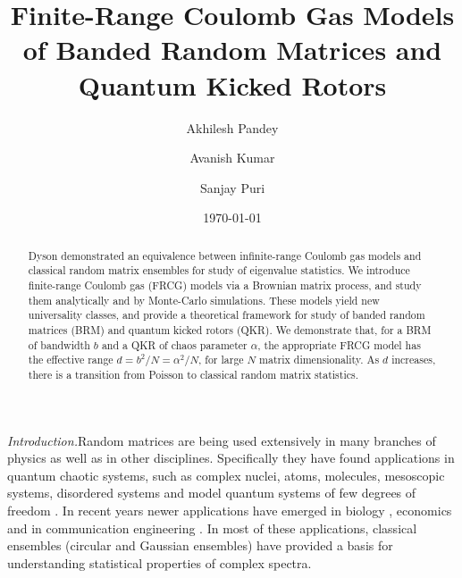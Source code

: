 \documentclass[reprint,amsmath,amssymb,showpacs,aps,]{revtex4-1}
\begin{document}
\title{Finite-Range Coulomb Gas Models of Banded Random Matrices and Quantum Kicked Rotors}
\author{Akhilesh Pandey}
\author{Avanish Kumar}
\author{Sanjay Puri}
\date{\today}

\begin{abstract}
Dyson demonstrated an equivalence between infinite-range Coulomb gas models and classical random matrix ensembles for study of eigenvalue statistics. We introduce finite-range Coulomb gas (FRCG) models via a Brownian matrix process, and study them analytically and by Monte-Carlo simulations. These models yield new universality classes, and provide a theoretical framework for study of banded random matrices (BRM) and quantum kicked rotors (QKR). We demonstrate that, for a BRM of bandwidth $b$ and a QKR of chaos parameter $\alpha$, the appropriate FRCG model has the effective range $d=b^2/N= \alpha^2/N$, for large $N$ matrix dimensionality. As $d$ increases, there is a transition from Poisson to classical random matrix statistics.
\end{abstract}
\maketitle
\textit{Introduction.}\textemdash Random matrices are being used extensively in many branches of physics as well as in other disciplines. Specifically they have found applications in quantum chaotic systems, such as complex nuclei, atoms, molecules, mesoscopic systems, disordered systems and model quantum systems of few degrees of freedom \cite{CEP,EPW1,Brody,BGS,BG,ML,CC,CWB,GMW,AM,FH,CH,HS}. In recent years newer applications have emerged in biology \cite{RA,AST}, economics \cite{EC1,EC2} and in communication engineering \cite{COM1, COM2,COM3}. In most of these applications, classical ensembles (circular and Gaussian ensembles) have provided a basis for understanding statistical properties of complex spectra. \par 
\end{document}
